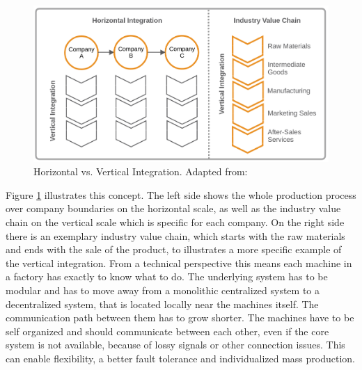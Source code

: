\begin{figure}[H]
    \centering
    \includegraphics[width=\textwidth]{resources/images/vertical_horizontal_integration.png}
    \caption[Horizontal vs. Vertical Integration]{Horizontal vs. Vertical Integration. Adapted from: \autocite{Jur:2013}}
    \label{fig:vertical_horizontal_integration}
\end{figure}

Figure \ref{fig:vertical_horizontal_integration} illustrates this concept.
The left side shows the whole production process over company boundaries on the horizontal scale, as well as the industry value chain on the vertical scale which is specific for each company.
On the right side there is an exemplary industry value chain, which starts with the raw materials and ends with the sale of the product, to illustrates a more specific example of the vertical integration.
From a technical perspective this means each machine in a factory has exactly to know what to do.
The underlying system has to be modular and has to move away from a monolithic centralized system to a decentralized system, that is located locally near the machines itself.
The communication path between them has to grow shorter.
The machines have to be self organized and should communicate between each other, even if the core system is not available, because of lossy signals or other connection issues.
This can enable flexibility, a better fault tolerance and individualized mass production.\autocite[cf.]{Lyd:2016}


